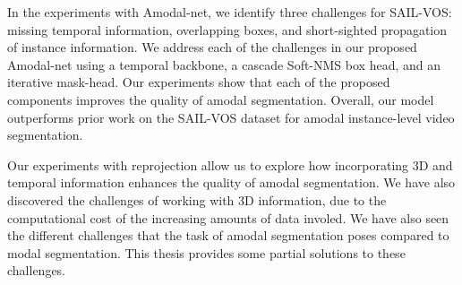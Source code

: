 In the experiments with Amodal-net, we identify three challenges for SAIL-VOS: missing temporal information, overlapping boxes, and short-sighted propagation of instance information. %
We address each of the challenges in our proposed Amodal-net using a temporal backbone, a cascade Soft-NMS box head, and an iterative mask-head. Our experiments show that each of the proposed components improves the quality of amodal segmentation. Overall, our model outperforms prior work on the SAIL-VOS dataset for amodal instance-level video segmentation.

Our experiments with reprojection allow us to explore how incorporating 3D and temporal information enhances the quality of amodal segmentation. We have also discovered the challenges of working with 3D information, due to the computational cost of the increasing amounts of data involed. We have also seen the different challenges that the task of amodal segmentation poses compared to modal segmentation. This thesis provides some partial solutions to these challenges.